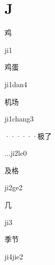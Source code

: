 ﻿%
\section*{J}
\begin{multicols*}{2}

\begin{verbete}[ji1]{鸡}
\begin{pronuncia}{ji1}
\end{pronuncia}
\end{verbete}

\begin{verbete}[ji1dan4]{鸡蛋}
\begin{pronuncia}{ji1dan4}
\end{pronuncia}
\end{verbete}

\begin{verbete}[ji1chang3]{机场}
\begin{pronuncia}{ji1chang3}
\end{pronuncia}
\end{verbete}

\begin{verbete}[...ji2le0]{······极了}
\begin{pronuncia}{...ji2le0}
\end{pronuncia}
\end{verbete}

\begin{verbete}[ji2ge2]{及格}
\begin{pronuncia}{ji2ge2}
\end{pronuncia}
\end{verbete}

\begin{verbete}[ji3]{几}
\begin{pronuncia}{ji3}
\end{pronuncia}
\end{verbete}

\begin{verbete}[ji4jie2]{季节}
\begin{pronuncia}{ji4jie2}
\end{pronuncia}
\end{verbete}


\end{multicols*}

